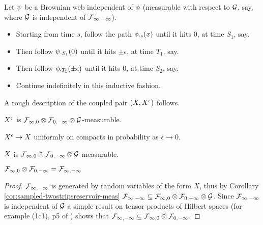 {{\begin{definition}
  Let $\psi$ be a Brownian web independent of $\phi$ (measurable with
  respect to $\mathcal{G}$, say, where $\mathcal{G}$ is independent of
  $\mathcal{F}_{\infty,-\infty}$).

  \begin{itemize}
  \item Starting from time $s$, follow the path $\phi_{\cdot s}(x)$
    until it hits $0$, at time $S_1$, say.
  \item Then follow $\psi_{\cdot S_1}(0)$ until it hits $\pm \epsilon$, at
    time $T_1$, say.
  \item Then follow $\phi_{\cdot T_1}(\pm \epsilon)$ until it hits $0$, at
    time $S_2$, say.
  \item Continue indefinitely in this inductive fashion.
  \end{itemize}
\end{definition}

}

\begin{obs}
  \label{obs:2d-proc}
  A rough description of the coupled pair $(X, X^{\epsilon})$
  follows.

  \FIXME{}{}
\end{obs}

\begin{obs}
  $X^{\epsilon}$ is $\mathcal{F}_{\infty,0} \otimes \mathcal{F}_{0,-\infty} \otimes \mathcal{G}$-measurable.
\end{obs}

\begin{lemma}
  $X^{\epsilon} \to X$ uniformly on compacts in probability as $\epsilon \to 0$.
\end{lemma}

\begin{cor}
  \label{cor:sampled-twostripsreservoir-meas}
  $X$ is $\mathcal{F}_{\infty,0} \otimes \mathcal{F}_{0,-\infty} \otimes \mathcal{G}$-measurable.
\end{cor}

\begin{theorem}
  $\mathcal{F}_{\infty,0} \otimes \mathcal{F}_{0,-\infty} = \mathcal{F}_{\infty,-\infty}$
\end{theorem}

\begin{proof}
  $\mathcal{F}_{\infty,-\infty}$ is generated by random variables of the form $X$, thus
  by Corollary \ref{cor:sampled-twostripsreservoir-meas} $\mathcal{F}_{\infty,-\infty}
  \subseteq \mathcal{F}_{\infty,0} \otimes \mathcal{F}_{0,-\infty} \otimes \mathcal{G}$.  Since $\mathcal{F}_{\infty,-\infty}$ is
  independent of $\mathcal{G}$ a simple result on tensor products of
  Hilbert spaces (for example (1c1), p5 of
  \cite{tsirelson-completion}) shows
  that $\mathcal{F}_{\infty,-\infty} \subseteq \mathcal{F}_{\infty,0} \otimes \mathcal{F}_{0,-\infty}$.
\end{proof}
}
